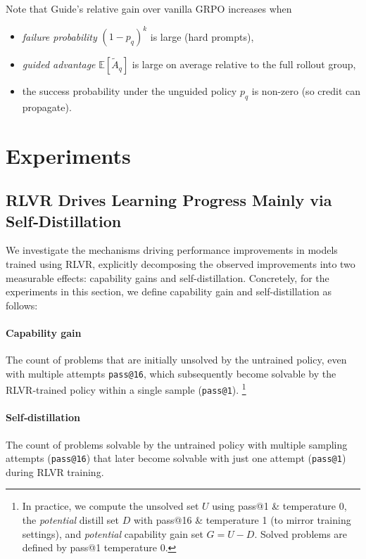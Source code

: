 \documentclass{article}
\begin{document}
Note that Guide's relative gain over vanilla GRPO increases when
\begin{itemize}
  \item \emph{failure probability} $(1-p_q)^k$ is large (hard prompts),
  \item \emph{guided advantage} $\mathbb{E}[\tilde A_q]$  is large on average relative to the full rollout group,
  \item the success probability under the unguided policy $p_q$ is non-zero (so credit
        can propagate).
\end{itemize}

\vspace{-1mm}
\section{Experiments}
\label{sec:results}

\subsection{RLVR Drives Learning Progress Mainly via Self‑Distillation}
\label{sec:rlvr_sd}

We investigate the mechanisms driving performance improvements in models trained using RLVR, explicitly decomposing the observed improvements into two measurable effects: capability gains and self-distillation. Concretely, for the experiments in this section, we define capability gain and self-distillation as follows: 

\paragraph{Capability gain} \label{capability_gains_definition} The count of problems that are initially unsolved by the untrained policy, even with multiple attempts \texttt{pass@16}, which subsequently become solvable by the RLVR‑trained policy within a single sample (\texttt{pass@1}).
\footnote{In practice, we compute the unsolved set $U$ using pass@1 \& temperature 0, the \textit{potential} distill set $D$ with pass@16 \& temperature 1 (to mirror training settings), and \textit{potential} capability gain set $G = U - D$. Solved problems are defined by pass@1 temperature 0.}

\paragraph{Self‑distillation}\label{distillation_definition} The count of problems solvable by the untrained policy with multiple sampling attempts (\texttt{pass@16}) that later become solvable with just one attempt (\texttt{pass@1}) during RLVR training.
\end{document}
